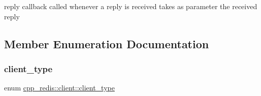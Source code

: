 reply callback called whenever a reply is received takes as parameter the received reply 

\subsection{Member Enumeration Documentation}
\mbox{\label{classcpp__redis_1_1client_a388877b01b4e045cddb138e70a68e000}} 
\subsubsection{\texorpdfstring{client\+\_\+type}{client\_type}}
{\footnotesize\ttfamily enum \hyperlink{classcpp__redis_1_1client_a388877b01b4e045cddb138e70a68e000}{cpp\+\_\+redis\+::client\+::client\+\_\+type}\hspace{0.3cm}{\ttfamily [strong]}}

